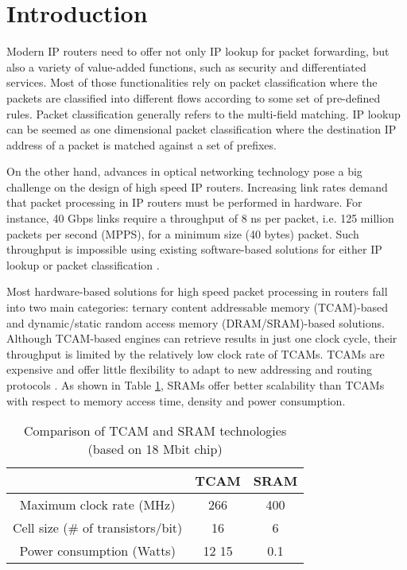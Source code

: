 \documentclass{sigcomm-alternate}
\begin{document}


\section{Introduction}
\label{sec:intro}

Modern IP routers need to offer not only IP lookup for packet forwarding, but also a variety of value-added functions, such as security and differentiated services. Most of those functionalities rely on packet classification where the packets are classified into different flows according to some set of pre-defined rules. Packet classification generally refers to the multi-field matching. IP lookup can be seemed as one dimensional packet classification where the destination IP address of a packet is matched against a set of prefixes. 

On the other hand, advances in optical networking technology pose a big challenge on the design of high speed IP routers. Increasing link rates demand that packet processing in IP routers must be performed in hardware. For instance, 40 Gbps links require a throughput of 8 ns per packet, i.e. 125 million packets per second (MPPS), for a minimum size (40 bytes) packet. Such throughput is impossible using existing software-based solutions for either IP lookup \cite{networkmag01:sanchez} or packet classification \cite{networkmag01:gupta}. 
  
Most hardware-based solutions for high speed packet processing in routers fall into two main categories: ternary content addressable memory (TCAM)-based and dynamic/static random access memory (DRAM/SRAM)-based solutions. Although TCAM-based engines can retrieve results in just one clock cycle, their throughput is limited by the relatively low clock rate of TCAMs. TCAMs are expensive and offer little flexibility to adapt to new addressing and routing protocols \cite{infocom08:jiang}. As shown in Table \ref{tb:tcamvssram}, SRAMs offer better scalability than TCAMs with respect to memory access time, density and power consumption. 
  
\begin{table}[htb]
\caption{Comparison of TCAM and SRAM technologies (based on 18 Mbit chip)}
\label{tb:tcamvssram}
\vspace{-0.11in}
\begin{center}
\begin{tabular}{|c|c|c|}
\hline
 & TCAM  & SRAM \\
\hline
\hline
Maximum clock rate (MHz) & 266  \cite{renesas} & 400 \cite{cypress, samsung} \\
\hline
Cell size (\# of transistors/bit) & 16 & 6 \\
\hline
Power consumption (Watts) & 12  15 \cite{ton06:zheng} &  0.1 \cite{cacti}\\
\hline
\end{tabular}
\end{center}
\end{table}
\end{document}
